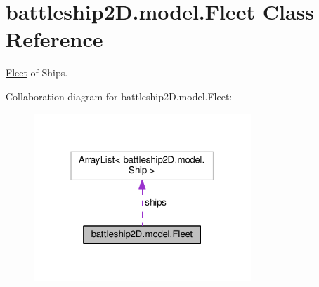 \hypertarget{classbattleship2D_1_1model_1_1Fleet}{\section{battleship2\-D.\-model.\-Fleet Class Reference}
\label{classbattleship2D_1_1model_1_1Fleet}
}


\hyperlink{classbattleship2D_1_1model_1_1Fleet}{Fleet} of Ships.  




Collaboration diagram for battleship2\-D.\-model.\-Fleet\-:\nopagebreak
\begin{figure}[H]
\begin{center}
\leavevmode
\includegraphics[width=232pt]{classbattleship2D_1_1model_1_1Fleet__coll__graph}
\end{center}
\end{figure}
